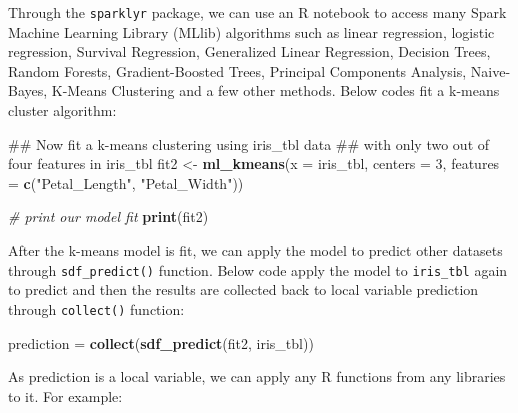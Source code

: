 \documentclass[]{book}
\newenvironment{Shaded}{\begin{snugshade}}{\end{snugshade}}
\newcommand{\KeywordTok}[1]{\textcolor[rgb]{0.13,0.29,0.53}{\textbf{{#1}}}}
\newcommand{\DataTypeTok}[1]{\textcolor[rgb]{0.13,0.29,0.53}{{#1}}}
\newcommand{\DecValTok}[1]{\textcolor[rgb]{0.00,0.00,0.81}{{#1}}}
\newcommand{\StringTok}[1]{\textcolor[rgb]{0.31,0.60,0.02}{{#1}}}
\newcommand{\CommentTok}[1]{\textcolor[rgb]{0.56,0.35,0.01}{\textit{{#1}}}}
\newcommand{\NormalTok}[1]{{#1}}
\theoremstyle{definition}
\theoremstyle{definition}
\theoremstyle{remark}
\begin{document}
Through the \texttt{sparklyr} package, we can use an R notebook to
access many Spark Machine Learning Library (MLlib) algorithms such as
linear regression, logistic regression, Survival Regression, Generalized
Linear Regression, Decision Trees, Random Forests, Gradient-Boosted
Trees, Principal Components Analysis, Naive-Bayes, K-Means Clustering
and a few other methods. Below codes fit a k-means cluster algorithm:

\begin{Shaded}
\begin{Highlighting}[]
\NormalTok{## Now fit a k-means clustering using iris_tbl data }
\NormalTok{## with only two out of four features in iris_tbl}
\NormalTok{fit2 <-}\StringTok{ }\KeywordTok{ml_kmeans}\NormalTok{(}\DataTypeTok{x =} \NormalTok{iris_tbl, }\DataTypeTok{centers =} \DecValTok{3}\NormalTok{, }
                  \DataTypeTok{features =} \KeywordTok{c}\NormalTok{(}\StringTok{"Petal_Length"}\NormalTok{, }\StringTok{"Petal_Width"}\NormalTok{))}

\CommentTok{# print our model fit}
\KeywordTok{print}\NormalTok{(fit2)}
\end{Highlighting}
\end{Shaded}

After the k-means model is fit, we can apply the model to predict other
datasets through \texttt{sdf\_predict()} function. Below code apply the
model to \texttt{iris\_tbl} again to predict and then the results are
collected back to local variable prediction through \texttt{collect()}
function:

\begin{Shaded}
\begin{Highlighting}[]
\NormalTok{prediction =}\StringTok{ }\KeywordTok{collect}\NormalTok{(}\KeywordTok{sdf_predict}\NormalTok{(fit2, iris_tbl)) }
\end{Highlighting}
\end{Shaded}

As prediction is a local variable, we can apply any R functions from any
libraries to it. For example:
\end{document}
